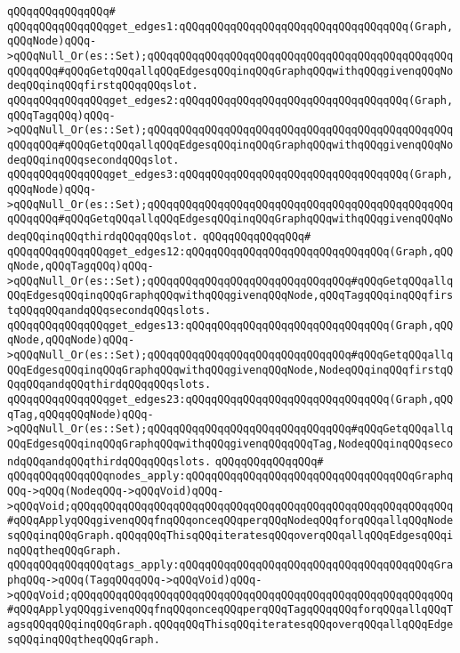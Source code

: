\verb|qQQqqQQqqQQqqQQq#|\newline
\verb|qQQqqQQqqQQqqQQqget_edges1:qQQqqQQqqQQqqQQqqQQqqQQqqQQqqQQqqQQq(Graph,qQQqNode)qQQq->qQQqNull_Or(es::Set);qQQqqQQqqQQqqQQqqQQqqQQqqQQqqQQqqQQqqQQqqQQqqQQqqQQqqQQq#qQQqGetqQQqallqQQqEdgesqQQqinqQQqGraphqQQqwithqQQqgivenqQQqNodeqQQqinqQQqfirstqQQqqQQqslot.|\newline
\verb|qQQqqQQqqQQqqQQqget_edges2:qQQqqQQqqQQqqQQqqQQqqQQqqQQqqQQqqQQq(Graph,qQQqTagqQQq)qQQq->qQQqNull_Or(es::Set);qQQqqQQqqQQqqQQqqQQqqQQqqQQqqQQqqQQqqQQqqQQqqQQqqQQqqQQq#qQQqGetqQQqallqQQqEdgesqQQqinqQQqGraphqQQqwithqQQqgivenqQQqNodeqQQqinqQQqsecondqQQqslot.|\newline
\verb|qQQqqQQqqQQqqQQqget_edges3:qQQqqQQqqQQqqQQqqQQqqQQqqQQqqQQqqQQq(Graph,qQQqNode)qQQq->qQQqNull_Or(es::Set);qQQqqQQqqQQqqQQqqQQqqQQqqQQqqQQqqQQqqQQqqQQqqQQqqQQqqQQq#qQQqGetqQQqallqQQqEdgesqQQqinqQQqGraphqQQqwithqQQqgivenqQQqNodeqQQqinqQQqthirdqQQqqQQqslot.|\newline
\verb|qQQqqQQqqQQqqQQq#|\newline
\verb|qQQqqQQqqQQqqQQqget_edges12:qQQqqQQqqQQqqQQqqQQqqQQqqQQqqQQq(Graph,qQQqNode,qQQqTagqQQq)qQQq->qQQqNull_Or(es::Set);qQQqqQQqqQQqqQQqqQQqqQQqqQQqqQQq#qQQqGetqQQqallqQQqEdgesqQQqinqQQqGraphqQQqwithqQQqgivenqQQqNode,qQQqTagqQQqinqQQqfirstqQQqqQQqandqQQqsecondqQQqslots.|\newline
\verb|qQQqqQQqqQQqqQQqget_edges13:qQQqqQQqqQQqqQQqqQQqqQQqqQQqqQQq(Graph,qQQqNode,qQQqNode)qQQq->qQQqNull_Or(es::Set);qQQqqQQqqQQqqQQqqQQqqQQqqQQqqQQq#qQQqGetqQQqallqQQqEdgesqQQqinqQQqGraphqQQqwithqQQqgivenqQQqNode,NodeqQQqinqQQqfirstqQQqqQQqandqQQqthirdqQQqqQQqslots.|\newline
\verb|qQQqqQQqqQQqqQQqget_edges23:qQQqqQQqqQQqqQQqqQQqqQQqqQQqqQQq(Graph,qQQqTag,qQQqqQQqNode)qQQq->qQQqNull_Or(es::Set);qQQqqQQqqQQqqQQqqQQqqQQqqQQqqQQq#qQQqGetqQQqallqQQqEdgesqQQqinqQQqGraphqQQqwithqQQqgivenqQQqqQQqTag,NodeqQQqinqQQqsecondqQQqandqQQqthirdqQQqqQQqslots.|\newline
\verb|qQQqqQQqqQQqqQQq#|\newline
\newline
\verb|qQQqqQQqqQQqqQQqnodes_apply:qQQqqQQqqQQqqQQqqQQqqQQqqQQqqQQqqQQqGraphqQQq->qQQq(NodeqQQq->qQQqVoid)qQQq->qQQqVoid;qQQqqQQqqQQqqQQqqQQqqQQqqQQqqQQqqQQqqQQqqQQqqQQqqQQqqQQqqQQq#qQQqApplyqQQqgivenqQQqfnqQQqonceqQQqperqQQqNodeqQQqforqQQqallqQQqNodesqQQqinqQQqGraph.qQQqqQQqThisqQQqiteratesqQQqoverqQQqallqQQqEdgesqQQqinqQQqtheqQQqGraph.|\newline
\verb|qQQqqQQqqQQqqQQqtags_apply:qQQqqQQqqQQqqQQqqQQqqQQqqQQqqQQqqQQqqQQqGraphqQQq->qQQq(TagqQQqqQQq->qQQqVoid)qQQq->qQQqVoid;qQQqqQQqqQQqqQQqqQQqqQQqqQQqqQQqqQQqqQQqqQQqqQQqqQQqqQQqqQQq#qQQqApplyqQQqgivenqQQqfnqQQqonceqQQqperqQQqTagqQQqqQQqforqQQqallqQQqTagsqQQqqQQqinqQQqGraph.qQQqqQQqThisqQQqiteratesqQQqoverqQQqallqQQqEdgesqQQqinqQQqtheqQQqGraph.|\newline
